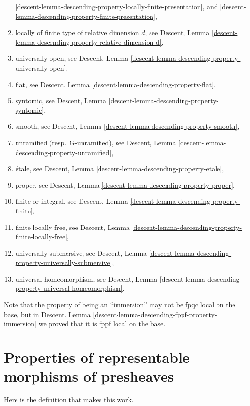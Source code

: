 \begin{remark}
\begin{enumerate}
\ref{descent-lemma-descending-property-locally-finite-presentation}, and
\ref{descent-lemma-descending-property-finite-presentation},
\item locally of finite type of relative dimension $d$, see
Descent,
Lemma \ref{descent-lemma-descending-property-relative-dimension-d},
\item universally open, see
Descent, Lemma \ref{descent-lemma-descending-property-universally-open},
\item flat, see
Descent, Lemma \ref{descent-lemma-descending-property-flat},
\item syntomic, see
Descent, Lemma \ref{descent-lemma-descending-property-syntomic},
\item smooth, see
Descent, Lemma \ref{descent-lemma-descending-property-smooth},
\item unramified (resp.\ G-unramified), see
Descent, Lemma \ref{descent-lemma-descending-property-unramified},
\item \'etale, see
Descent, Lemma \ref{descent-lemma-descending-property-etale},
\item proper, see
Descent, Lemma \ref{descent-lemma-descending-property-proper},
\item finite or integral, see
Descent, Lemma \ref{descent-lemma-descending-property-finite},
\item finite locally free, see
Descent, Lemma \ref{descent-lemma-descending-property-finite-locally-free},
\item universally submersive, see
Descent, Lemma \ref{descent-lemma-descending-property-universally-submersive},
\item universal homeomorphism, see
Descent, Lemma \ref{descent-lemma-descending-property-universal-homeomorphism}.
\end{enumerate}
Note that the property of being an ``immersion'' may not be fpqc local
on the base, but in
Descent, Lemma \ref{descent-lemma-descending-fppf-property-immersion}
we proved that it is fppf local on the base.
\end{remark}








\section{Properties of representable morphisms of presheaves}
\label{section-representable-properties}

\noindent
Here is the definition that makes this work.

